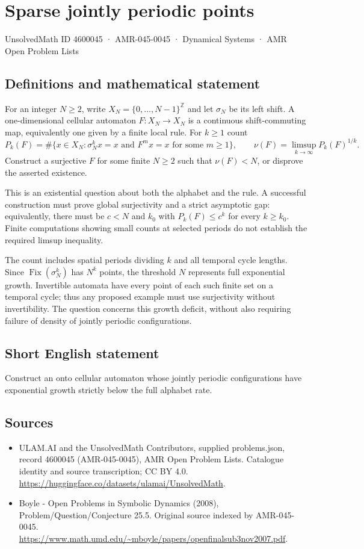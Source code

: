 \documentclass[11pt,a4paper]{article}
\begin{document}
\section*{Sparse jointly periodic points}\label{4600045}
{\small UnsolvedMath ID 4600045 · AMR-045-0045 · Dynamical Systems · AMR Open Problem Lists}
\subsection{Definitions and mathematical statement}
For an integer $N\ge2$, write $X_N=\{0,\ldots,N-1\}^{\mathbb Z}$
and let $\sigma_N$ be its left shift. A one-dimensional
cellular automaton $F:X_N\to X_N$ is a continuous shift-commuting
map, equivalently one given by a finite local rule. For $k\ge1$
count
\[
 P_k(F)=\#\{x\in X_N:\sigma_N^k x=x
                    \text{ and }F^m x=x\text{ for some }m\ge1\},
 \qquad \nu(F)=\limsup_{k\to\infty}P_k(F)^{1/k}.
\]
Construct a surjective $F$ for some finite $N\ge2$ such that
$\nu(F)<N$, or disprove the asserted existence.

This is an existential question about both the alphabet and the
rule. A successful construction must prove global surjectivity
and a strict asymptotic gap: equivalently, there must be
$c<N$ and $k_0$ with $P_k(F)\le c^k$ for every $k\ge k_0$.
Finite computations showing small counts at selected periods
do not establish the required limsup inequality.

The count includes spatial periods dividing $k$ and all temporal
cycle lengths. Since $\operatorname{Fix}(\sigma_N^k)$ has
$N^k$ points, the threshold $N$ represents full exponential
growth. Invertible automata have every point of each such finite
set on a temporal cycle; thus any proposed example must use
surjectivity without invertibility. The question concerns this
growth deficit, without also requiring failure of density of
jointly periodic configurations.
\subsection{Short English statement}
Construct an onto cellular automaton whose jointly periodic configurations have exponential growth strictly below the full alphabet rate.
\subsection{Sources}
\begin{itemize}
\item[S1] ULAM.AI and the UnsolvedMath Contributors, supplied problems.json, record 4600045 (AMR-045-0045), AMR Open Problem Lists. Catalogue identity and source transcription; CC BY 4.0.
\url{https://huggingface.co/datasets/ulamai/UnsolvedMath}.
\item[S2] Boyle - Open Problems in Symbolic Dynamics (2008), Problem/Question/Conjecture 25.5. Original source indexed by AMR-045-0045.
\url{https://www.math.umd.edu/~mboyle/papers/openfinalsub3nov2007.pdf}.
\end{itemize}
\end{document}
